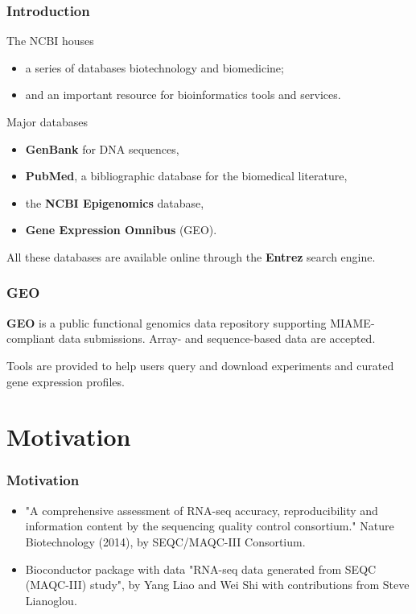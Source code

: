 \documentclass{beamer}
\begin{document}
\begin{frame}
\frametitle{Introduction}
The NCBI houses 
\begin{itemize}
\item a series of databases biotechnology and biomedicine;\pause
\item and an important resource for bioinformatics tools and services. \pause
\end{itemize}
\vspace{0.3cm}
Major databases 
\begin{itemize}
\item {\bf GenBank} for DNA sequences, \pause
\item {\bf PubMed}, a bibliographic database for the biomedical literature, \pause
\item the {\bf NCBI Epigenomics} database, \pause
\item {\bf Gene Expression Omnibus} (GEO).\pause
\end{itemize}
All these databases are available online through the {\bf Entrez} search engine.
\end{frame}

\begin{frame}
\frametitle{GEO}
{\bf GEO} is a public functional genomics data repository supporting MIAME-compliant data submissions. Array- and sequence-based data are accepted.\par Tools are provided to help users query and download experiments and curated gene expression profiles.

\end{frame}
\section{Motivation}
\begin{frame}
\frametitle{Motivation}
\begin{itemize}
\item "A comprehensive assessment of RNA-seq accuracy, reproducibility and information content by the sequencing quality control consortium." Nature Biotechnology (2014), by SEQC/MAQC-III Consortium.
\pause
\item Bioconductor package with data "RNA-seq data generated from SEQC (MAQC-III) study", by Yang Liao and Wei Shi with contributions from Steve Lianoglou.
\pause
\end{itemize}
\end{frame}
\end{document}
